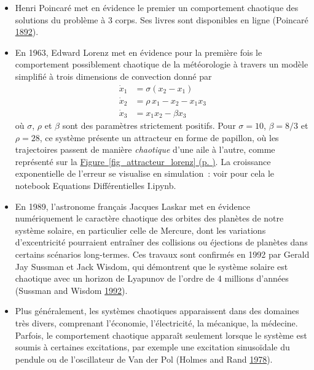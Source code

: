 \hypertarget{ex_chaos}{}
\begin{exemple}\label{ex_chaos}
\begin{itemize}
\item
  Henri Poincaré met en évidence le premier un comportement chaotique
  des solutions du problème à 3 corps. Ses livres sont disponibles en
  ligne (Poincaré \protect\hyperlink{ref-poincare}{1892}).
\item
  En 1963, Edward Lorenz met en évidence pour la première fois le
  comportement possiblement chaotique de la météorologie à travers un
  modèle simplifié à trois dimensions de convection donné par
  \begin{align*}
  \dot{x}_1 &= \sigma (x_2-x_1) \\
  \dot{x}_2 &= \rho \, x_1 - x_2 -x_1x_3 \\
  \dot{x}_3 &= x_1x_2-\beta x_3 
  \end{align*} où \(\sigma\), \(\rho\) et \(\beta\) sont des paramètres
  strictement positifs. Pour \(\sigma=10\), \(\beta=8/3\) et
  \(\rho=28\), ce système présente un attracteur en forme de papillon,
  où les trajectoires passent de manière \emph{chaotique} d'une aile à
  l'autre, comme représenté sur la
  \protect\hyperlink{fig_attracteur_lorenz}{Figure~\ref*{fig_attracteur_lorenz} (p.
  \pageref*{fig_attracteur_lorenz})}. La croissance
  exponentielle de l'erreur se visualise en simulation~: voir pour cela
  le notebook Equations Différentielles I.ipynb.
\item
  En 1989, l'astronome français Jacques Laskar met en évidence
  numériquement le caractère chaotique des orbites des planètes de notre
  système solaire, en particulier celle de Mercure, dont les variations
  d'excentricité pourraient entraîner des collisions ou éjections de
  planètes dans certains scénarios long-termes. Ces travaux sont
  confirmés en 1992 par Gerald Jay Sussman et Jack Wisdom, qui
  démontrent que le système solaire est chaotique avec un horizon de
  Lyapunov de l'ordre de 4 millions d'années (Sussman and Wisdom
  \protect\hyperlink{ref-SussWis}{1992}).
\item
  Plus généralement, les systèmes chaotiques apparaissent dans des
  domaines très divers, comprenant l'économie, l'électricité, la
  mécanique, la médecine. Parfois, le comportement chaotique apparaît
  seulement lorsque le système est soumis à certaines excitations, par
  exemple une excitation sinusoïdale du pendule ou de l'oscillateur de
  Van der Pol (Holmes and Rand \protect\hyperlink{ref-HolRand}{1978}).
\end{itemize}
\end{exemple}

